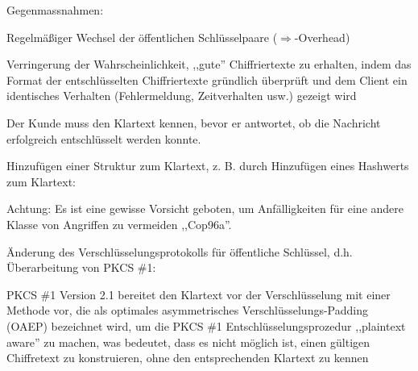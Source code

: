\documentclass[a4paper]{article}
\begin{document}
\begin{multicols}{3}
\begin{itemize*}
\begin{itemize*}
\begin{itemize*}
                  \end{itemize*}
                  \item Gegenmassnahmen:
                  \begin{itemize*}
                        \item Regelmäßiger Wechsel der öffentlichen Schlüsselpaare ($\Rightarrow$-Overhead)
                        \item Verringerung der Wahrscheinlichkeit, ,,gute'' Chiffriertexte zu erhalten, indem das Format der entschlüsselten Chiffriertexte gründlich überprüft und dem Client ein identisches Verhalten (Fehlermeldung, Zeitverhalten usw.) gezeigt wird
                        \item Der Kunde muss den Klartext kennen, bevor er antwortet, ob die Nachricht erfolgreich entschlüsselt werden konnte.
                        \item Hinzufügen einer Struktur zum Klartext, z. B. durch Hinzufügen eines Hashwerts zum Klartext:
                        \begin{itemize*} \item Achtung: Es ist eine gewisse Vorsicht geboten, um Anfälligkeiten für eine andere Klasse von Angriffen zu vermeiden ,,Cop96a''. \end{itemize*}
                        \item Änderung des Verschlüsselungsprotokolls für öffentliche Schlüssel, d.h. Überarbeitung von PKCS \#1:
                        \begin{itemize*} \item PKCS \#1 Version 2.1 bereitet den Klartext vor der Verschlüsselung mit einer Methode vor, die als optimales asymmetrisches Verschlüsselungs-Padding (OAEP) bezeichnet wird, um die PKCS \#1 Entschlüsselungsprozedur ,,plaintext aware'' zu machen, was bedeutet, dass es nicht möglich ist, einen gültigen Chiffretext zu konstruieren, ohne den entsprechenden Klartext zu kennen \end{itemize*}
                  \end{itemize*}
            \end{itemize*}


\end{itemize*}
\end{multicols}
\end{document}
